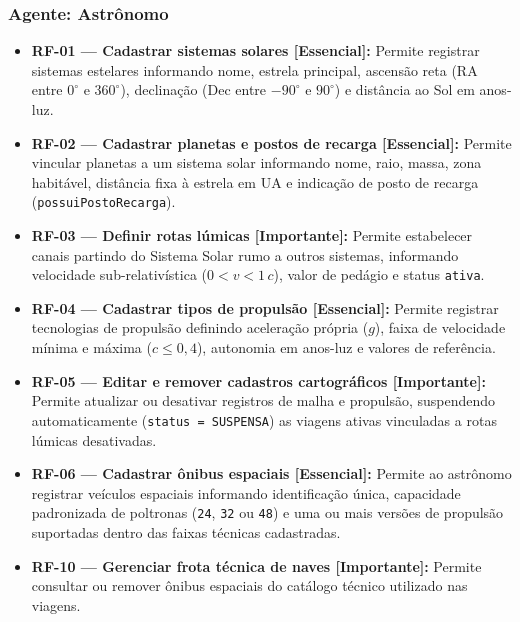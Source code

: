 \documentclass[12pt, a4paper]{article}
\begin{document}
\subsubsection{Agente: Astrônomo}
\begin{itemize}
    \item \textbf{RF-01 --- Cadastrar sistemas solares [Essencial]:} Permite registrar sistemas estelares informando nome, estrela principal, ascensão reta (RA entre $0^\circ$ e $360^\circ$), declinação (Dec entre $-90^\circ$ e $90^\circ$) e distância ao Sol em anos-luz.
    \item \textbf{RF-02 --- Cadastrar planetas e postos de recarga [Essencial]:} Permite vincular planetas a um sistema solar informando nome, raio, massa, zona habitável, distância fixa à estrela em UA e indicação de posto de recarga (\texttt{possuiPostoRecarga}).
    \item \textbf{RF-03 --- Definir rotas lúmicas [Importante]:} Permite estabelecer canais partindo do Sistema Solar rumo a outros sistemas, informando velocidade sub-relativística ($0 < v < 1\,c$), valor de pedágio e status \texttt{ativa}.
    \item \textbf{RF-04 --- Cadastrar tipos de propulsão [Essencial]:} Permite registrar tecnologias de propulsão definindo aceleração própria ($g$), faixa de velocidade mínima e máxima ($c \le 0{,}4$), autonomia em anos-luz e valores de referência.
    \item \textbf{RF-05 --- Editar e remover cadastros cartográficos [Importante]:} Permite atualizar ou desativar registros de malha e propulsão, suspendendo automaticamente (\texttt{status = SUSPENSA}) as viagens ativas vinculadas a rotas lúmicas desativadas.
    \item \textbf{RF-06 --- Cadastrar ônibus espaciais [Essencial]:} Permite ao astrônomo registrar veículos espaciais informando identificação única, capacidade padronizada de poltronas (\texttt{24}, \texttt{32} ou \texttt{48}) e uma ou mais versões de propulsão suportadas dentro das faixas técnicas cadastradas.
    \item \textbf{RF-10 --- Gerenciar frota técnica de naves [Importante]:} Permite consultar ou remover ônibus espaciais do catálogo técnico utilizado nas viagens.
\end{itemize}
\end{document}
